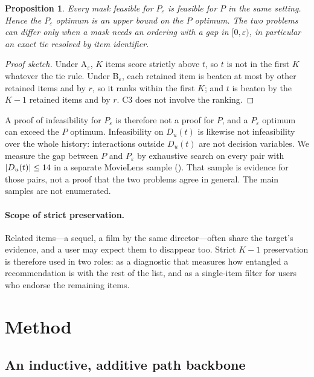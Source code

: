 \documentclass[11pt]{article}
\newtheorem{proposition}{Proposition}
\newcommand{\Peps}{P_\varepsilon}
\begin{document}
\begin{proposition}\label{prop:eps}
Every mask feasible for $\Peps$ is feasible for $P$ in the same setting. Hence the $\Peps$ optimum is an upper bound on
the $P$ optimum. The two problems can differ only when a mask needs an ordering with a gap in $[0,\varepsilon)$, in
particular an exact tie resolved by item identifier.
\end{proposition}
\begin{proof}[Proof sketch]
Under A$_\varepsilon$, $K$ items score strictly above $t$, so $t$ is not in the first $K$ whatever the tie rule.
Under B$_\varepsilon$, each retained item is beaten at most by other retained items and by $r$, so it ranks within the
first $K$; and $t$ is beaten by the $K-1$ retained items and by $r$. C3 does not involve the ranking.
\end{proof}

A proof of infeasibility for $\Peps$ is therefore not a proof for $P$, and a $\Peps$ optimum can exceed the $P$
optimum. Infeasibility on $D_u(t)$ is likewise not infeasibility over the whole history: interactions outside
$D_u(t)$ are not decision variables. We measure the gap between $P$ and $\Peps$ by exhaustive search on every pair
with $|D_u(t)|\le14$ in a separate MovieLens sample (). That sample is evidence for those
pairs, not a proof that the two problems agree in general. The main samples are not enumerated.

\paragraph{Scope of strict preservation.} Related items---a sequel, a film by the same director---often share the
target's evidence, and a user may expect them to disappear too. Strict $K-1$ preservation is therefore used in two
roles: as a diagnostic that measures how entangled a recommendation is with the rest of the list, and as a
single-item filter for users who endorse the remaining items.

\section{Method}
\label{sec:method}

\subsection{An inductive, additive path backbone}
\end{document}
